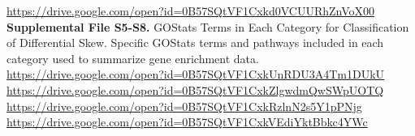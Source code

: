 \documentclass[11pt]{article}
\begin{document}
\newline
\newline
\href{https://drive.google.com/open?id=0B57SQtVF1Cxkd0VCUURhZnVoX00}{https://drive.google.com/open?id=0B57SQtVF1Cxkd0VCUURhZnVoX00}
\newline
\newline
\textbf{Supplemental File S5-S8.} GOStats Terms in Each Category for  Classification of Differential Skew. Specific GOStats terms and pathways included in each category used to summarize gene enrichment data.
\newline
\newline
\href{https://drive.google.com/open?id=0B57SQtVF1CxkUnRDU3A4Tm1DUkU}{https://drive.google.com/open?id=0B57SQtVF1CxkUnRDU3A4Tm1DUkU}
\\
\href{https://drive.google.com/open?id=0B57SQtVF1CxkZlgwdmQwSWpUOTQ}{https://drive.google.com/open?id=0B57SQtVF1CxkZlgwdmQwSWpUOTQ}
\\
\href{https://drive.google.com/open?id=0B57SQtVF1CxkRzlnN2s5Y1pPNjg}{https://drive.google.com/open?id=0B57SQtVF1CxkRzlnN2s5Y1pPNjg}
\\
\href{https://drive.google.com/open?id=0B57SQtVF1CxkVEdiYktBbkc4YWc}{https://drive.google.com/open?id=0B57SQtVF1CxkVEdiYktBbkc4YWc}
\end{document}
